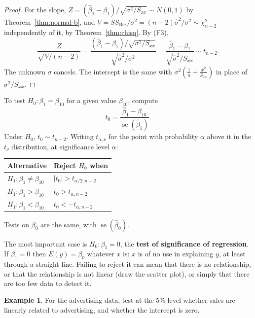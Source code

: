 \documentclass[11pt,a4paper]{article}
\numberwithin{equation}{section}
\theoremstyle{definition}
\newtheorem{exa}[thm]{Example}
\begin{document}
\begin{proof}
For the slope, $Z = (\hat\beta_1 - \beta_1)\big/\sqrt{\sigma^2/S_{xx}} \sim N(0,1)$ by
Theorem~\ref{thm:normal-b}, and $V = SS_{\mathrm{Res}}/\sigma^2 = (n-2)\hat\sigma^2/\sigma^2 \sim \chi^2_{n-2}$
independently of it, by Theorem~\ref{thm:chisq}. By (F3),
\[
\frac{Z}{\sqrt{V/(n-2)}} = \frac{(\hat\beta_1 - \beta_1)\big/\sqrt{\sigma^2/S_{xx}}}{\sqrt{\hat\sigma^2/\sigma^2}}
= \frac{\hat\beta_1 - \beta_1}{\sqrt{\hat\sigma^2/S_{xx}}} \sim t_{n-2} .
\]
The unknown $\sigma$ cancels. The intercept is the same with
$\sigma^2\left(\frac1n + \frac{\bar x^2}{S_{xx}}\right)$ in place of $\sigma^2/S_{xx}$.
\end{proof}

To test $H_0\colon \beta_1 = \beta_{10}$ for a given value $\beta_{10}$, compute
\[
t_0 = \frac{\hat\beta_1 - \beta_{10}}{\operatorname{se}(\hat\beta_1)} .
\]
Under $H_0$, $t_0 \sim t_{n-2}$. Writing $t_{\alpha, \nu}$ for the point with probability
$\alpha$ above it in the $t_\nu$ distribution, at significance level $\alpha$:
\begin{center}
\begin{tabular}{ll}
\hline
Alternative & Reject $H_0$ when \\
\hline
$H_1\colon \beta_1 \neq \beta_{10}$ & $|t_0| > t_{\alpha/2, n-2}$ \\
$H_1\colon \beta_1 > \beta_{10}$ & $t_0 > t_{\alpha, n-2}$ \\
$H_1\colon \beta_1 < \beta_{10}$ & $t_0 < -t_{\alpha, n-2}$ \\
\hline
\end{tabular}
\end{center}
Tests on $\beta_0$ are the same, with $\operatorname{se}(\hat\beta_0)$.

The most important case is $H_0\colon \beta_1 = 0$, the \textbf{test of significance of
regression}. If $\beta_1 = 0$ then $E(y) = \beta_0$ whatever $x$ is: $x$ is of no use in
explaining $y$, at least through a straight line. Failing to reject it can mean that there
is no relationship, or that the relationship is not linear (draw the scatter plot), or simply
that there are too few data to detect it.

\begin{exa}\label{exa:disney-test}
For the advertising data, test at the 5\% level whether sales are linearly related to
advertising, and whether the intercept is zero.
\end{exa}
\end{document}
